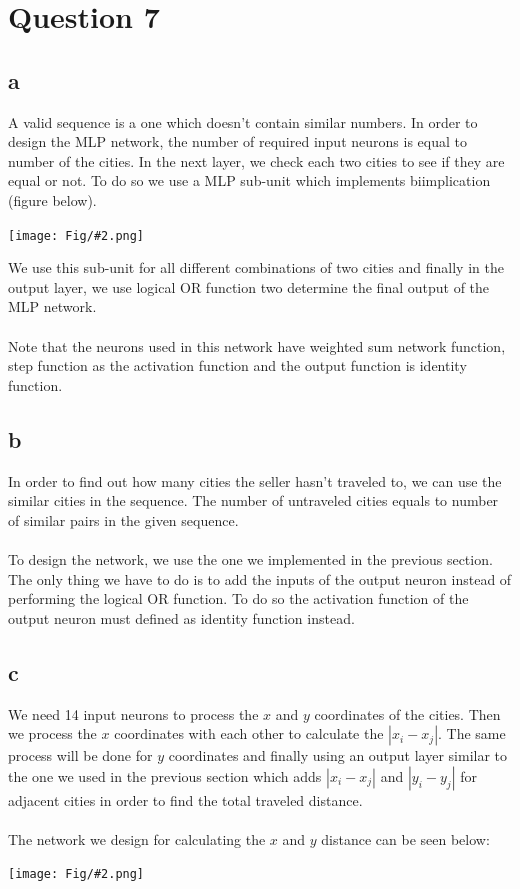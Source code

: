 \documentclass[]{article}
\newcommand{\pict}[2]{\begin{center}
		\texttt{[image: Fig/\#2.png]}
\end{center}}
\begin{document}
	\section{Question 7}
	\subsection*{a}
	A valid sequence is a one which doesn't contain similar numbers. In order to design the MLP network, the number of required input neurons is equal to number of the cities. In the next layer, we check each two cities to see if they are equal or not. To do so we use a MLP sub-unit which implements biimplication (figure below). 
	\pict{0.4}{F13}
	We use this sub-unit for all different combinations of two cities and finally in the output layer, we use logical OR function two determine the final output of the MLP network.\\\\
	Note that the neurons used in this network have weighted sum network function, step function as the activation function and the output function is identity function.
	
	\subsection*{b}
	In order to find out how many cities the seller hasn't traveled to, we can use the similar cities in the sequence. The number of untraveled cities equals to number of similar pairs in the given sequence.\\\\
	To design the network, we use the one we implemented in the previous section. The only thing we have to do is to add the inputs of the output neuron instead of performing the logical OR function. To do so the activation function of the output neuron must defined as identity function instead.
	
	\subsection*{c}
	We need 14 input neurons to process the $x$ and $y$ coordinates of the cities. Then we process the $x$ coordinates with each other to calculate the $|x_i - x_j|$. The same process will be done for $y$ coordinates and finally using an output layer similar to the one we used in the previous section which adds $|x_i - x_j|$ and $|y_i - y_j|$ for adjacent cities in order to find the total traveled distance.\\\\
	The network we design for calculating the $x$ and $y$ distance can be seen below:
	\pict{0.7}{F14}
	
\end{document}
